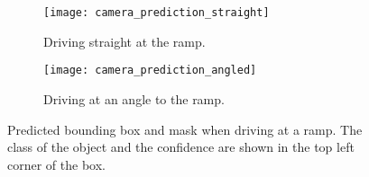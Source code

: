 \begin{figure}[htb]
	\centering
	\begin{subfigure}{1\textwidth}
		\centering
		\texttt{[image: camera\_prediction\_straight]}
		\caption{Driving straight at the ramp.}
		\label{fig:camera_prediction_straight}
	\end{subfigure}
	
	\begin{subfigure}{1\textwidth}
		\centering
		\texttt{[image: camera\_prediction\_angled]}
		\caption{Driving at an angle to the ramp.}
		\label{fig:camera_prediction_angled}
	\end{subfigure}
	\caption[Visualization examples of predicted segmentation masks]{Predicted bounding box and mask when driving at a ramp. The class of the object and the confidence are shown in the top left corner of the box.}
\end{figure}

